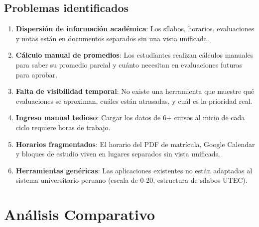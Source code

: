 \documentclass[
  spanish,
  11pt,
  a4paper,
]{article}
\providecommand{\tightlist}{%
  \setlength{\itemsep}{0pt}\setlength{\parskip}{0pt}}
\begin{document}
\subsection{Problemas identificados}\label{problemas-identificados}

\begin{enumerate}
\def\labelenumi{\arabic{enumi}.}
\tightlist
\item
  \textbf{Dispersión de información académica}: Los sílabos, horarios,
  evaluaciones y notas están en documentos separados sin una vista
  unificada.
\item
  \textbf{Cálculo manual de promedios}: Los estudiantes realizan
  cálculos manuales para saber su promedio parcial y cuánto necesitan en
  evaluaciones futuras para aprobar.
\item
  \textbf{Falta de visibilidad temporal}: No existe una herramienta que
  muestre qué evaluaciones se aproximan, cuáles están atrasadas, y cuál
  es la prioridad real.
\item
  \textbf{Ingreso manual tedioso}: Cargar los datos de 6+ cursos al
  inicio de cada ciclo requiere horas de trabajo.
\item
  \textbf{Horarios fragmentados}: El horario del PDF de matrícula,
  Google Calendar y bloques de estudio viven en lugares separados sin
  vista unificada.
\item
  \textbf{Herramientas genéricas}: Las aplicaciones existentes no están
  adaptadas al sistema universitario peruano (escala de 0-20, estructura
  de sílabos UTEC).
\end{enumerate}

\section{Análisis Comparativo}\label{anuxe1lisis-comparativo}
\end{document}
